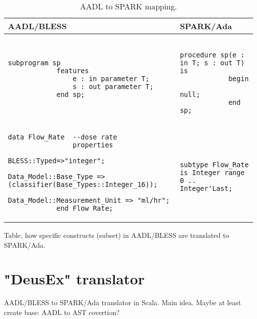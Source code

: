 \begin{table}[!ht]
	\caption{AADL to SPARK mapping.}
	\centering
  	\begin{tabular}{ | p{3in} | p{3in} |}

		\hline
		\textbf{AADL/BLESS} & \textbf{SPARK/Ada} \\ \hline	

		\begin{lstlisting}[language=aadl]
			subprogram sp
			features
				e : in parameter T;
				s : out parameter T;
			end sp;
		\end{lstlisting} 
		& 
		\begin{lstlisting}
			procedure sp(e : in T; s : out T) is 
			begin
				null;
			end sp;
		\end{lstlisting} 

		\\ \hline

		\begin{lstlisting}[language=aadl]
			data Flow_Rate  --dose rate
  				properties
    				BLESS::Typed=>"integer";
    				Data_Model::Base_Type => (classifier(Base_Types::Integer_16));
    				Data_Model::Measurement_Unit => "ml/hr";
			end Flow_Rate;
		\end{lstlisting} 
		& 
		\begin{lstlisting}
			subtype Flow_Rate is Integer range 0 .. Integer'Last;
		\end{lstlisting} 

		\\ \hline
	\end{tabular}
\end{table}

Table, how specific constructs (subset) in AADL/BLESS are translated to SPARK/Ada.

\section{"DeusEx" translator}
\label{codegen:translator}
AADL/BLESS to SPARK/Ada translator in Scala. Main idea.
Maybe at least create base: AADL to AST covertion?


